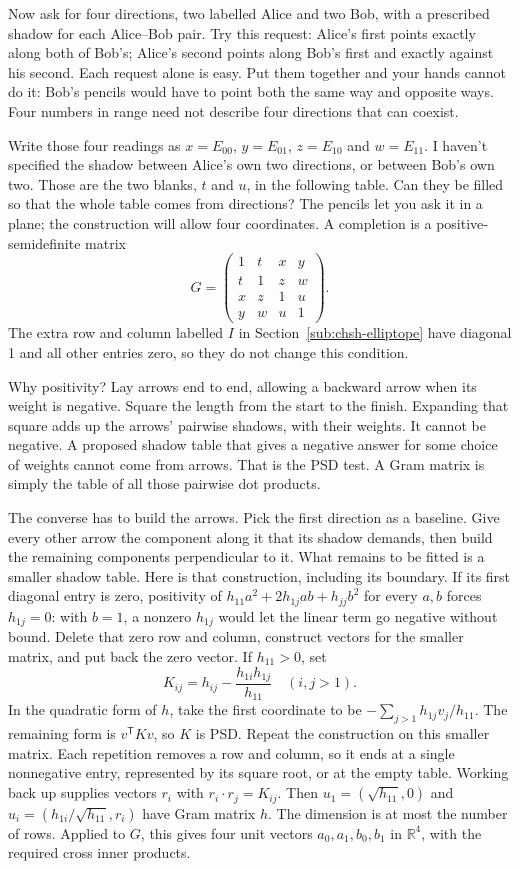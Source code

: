 \documentclass[11pt,twoside]{article}
\theoremstyle{thielethm}
\theoremstyle{thieledef}
\theoremstyle{thieledef}
\theoremstyle{thieledef}
\theoremstyle{thielethm}
\theoremstyle{thieleobs}
\theoremstyle{thielethm}
\begin{document}
Now ask for four directions, two labelled Alice and two Bob, with a prescribed
shadow for each Alice--Bob pair. Try this request: Alice's first points exactly
along both of Bob's; Alice's second points along Bob's first and exactly against
his second. Each request alone is easy. Put them together and your hands cannot do
it: Bob's pencils would have to point both the same way and opposite ways. Four
numbers in range need not describe four directions that can coexist.

Write those four readings as $x=E_{00}$, $y=E_{01}$, $z=E_{10}$ and $w=E_{11}$.
I haven't specified the shadow between Alice's own two directions, or between
Bob's own two. Those are the two blanks, $t$ and $u$, in the following table.
Can they be filled so that the whole table comes from directions? The pencils let
you ask it in a plane; the construction will allow four coordinates. A completion is
a positive-semidefinite matrix
\[
G=\begin{pmatrix}
1&t&x&y\\t&1&z&w\\x&z&1&u\\y&w&u&1
\end{pmatrix}.
\]
The extra row and column labelled $I$ in Section~\ref{sub:chsh-elliptope} have diagonal 1 and all other entries
zero, so they do not change this condition.

Why positivity? Lay arrows end to end, allowing a backward arrow when its weight
is negative. Square the length from the start to the finish. Expanding that square
adds up the arrows' pairwise shadows, with their weights. It cannot be negative.
A proposed shadow table that gives a negative answer for some choice of weights
cannot come from arrows. That is the PSD test. A Gram matrix is simply the table
of all those pairwise dot products.

The converse has to build the arrows. Pick the first direction as a baseline.
Give every other arrow the component along it that its shadow demands, then
build the remaining components perpendicular to it. What remains to be fitted is
a smaller shadow table. Here is that construction, including its boundary. If its first diagonal entry is zero, positivity of
$h_{11}a^2+2h_{1j}ab+h_{jj}b^2$ for every $a,b$ forces $h_{1j}=0$:
with $b=1$, a nonzero $h_{1j}$ would let the linear term go negative without bound.
Delete that zero row and column, construct vectors for the smaller matrix, and put back
the zero vector. If $h_{11}>0$, set
\[
K_{ij}=h_{ij}-\frac{h_{1i}h_{1j}}{h_{11}}\quad(i,j>1).
\]
In the quadratic form of $h$, take the first coordinate to be
$-\sum_{j>1}h_{1j}v_j/h_{11}$. The remaining form is $v^{\mathsf T}Kv$, so $K$ is PSD.
Repeat the construction on this smaller matrix. Each repetition removes a row
and column, so it ends at a single nonnegative entry, represented by its square
root, or at the empty table. Working back up supplies vectors $r_i$ with
$r_i\cdot r_j=K_{ij}$. Then
$u_1=(\sqrt{h_{11}},0)$ and $u_i=(h_{1i}/\sqrt{h_{11}},r_i)$ have Gram matrix $h$.
The dimension is at most the number of rows. Applied to $G$, this gives four unit
vectors $a_0,a_1,b_0,b_1$ in $\mathbb R^4$, with the required cross inner products.
\end{document}
